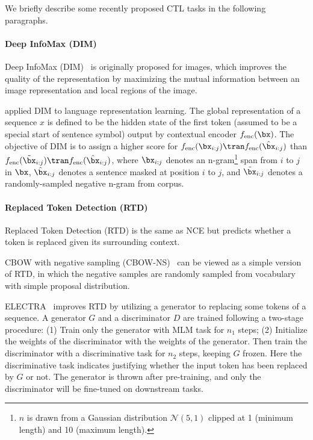 \documentclass[fleqn]{SCYE-arxiv}
\begin{document}
\begin{multicols}{2}

We briefly describe some recently proposed CTL tasks in the following paragraphs.

\paragraph{Deep InfoMax (DIM)}
Deep InfoMax (DIM)~\cite{DBLP:conf/iclr/HjelmFLGBTB19} is originally proposed for images, which improves the quality of the representation by maximizing the mutual information between an image
representation and local regions of the image.

\citet{kong2019mutual} applied DIM to language representation learning.
The global representation of a sequence $x$ is defined to be the hidden state of the first token (assumed to be a special start of sentence symbol) output by contextual encoder $f_{\mathrm{enc}}(\bx)$.
The objective of DIM is to assign a higher score for
$f_{\mathrm{enc}}(\bx_{i:j})\tran f_{\mathrm{enc}}(\hat{\bx}_{i:j})$ than $f_{\mathrm{enc}}(\tilde{\bx}_{i:j})\tran f_{\mathrm{enc}}(\hat{\bx}_{i:j})$,
where $\bx_{i:j}$ denotes an n-gram\footnote{$n$ is drawn from a Gaussian distribution
$\mathcal{N}(5, 1)$ clipped at 1 (minimum length) and 10 (maximum length).} span from $i$ to $j$ in $\bx$, $\hat{\bx}_{i:j}$ denotes a sentence masked at position $i$ to $j$,  and $\tilde{\bx}_{i:j}$ denotes a randomly-sampled  negative n-gram from corpus.


\paragraph{Replaced Token Detection (RTD)}

Replaced Token Detection (RTD) is the same as NCE but predicts whether a token is replaced given its surrounding context.


CBOW with negative sampling (CBOW-NS)~\cite{mikolov2013word2vec} can be viewed as a simple version of RTD, in which the negative samples are randomly sampled from vocabulary with simple proposal distribution.

ELECTRA~\cite{clark2020electra} improves RTD by utilizing a generator to replacing some tokens of a sequence. A generator $G$ and a discriminator $D$ are trained following a two-stage procedure: (1) Train only the generator with MLM task for $n_1$ steps; (2) Initialize the weights of the discriminator with the weights of the generator. Then train the discriminator with a discriminative task for $n_2$ steps, keeping $G$ frozen. Here the discriminative task indicates justifying whether the input token has been replaced by $G$ or not.
The generator is thrown after pre-training, and only the discriminator will be fine-tuned on downstream tasks.


\end{multicols}
\end{document}

